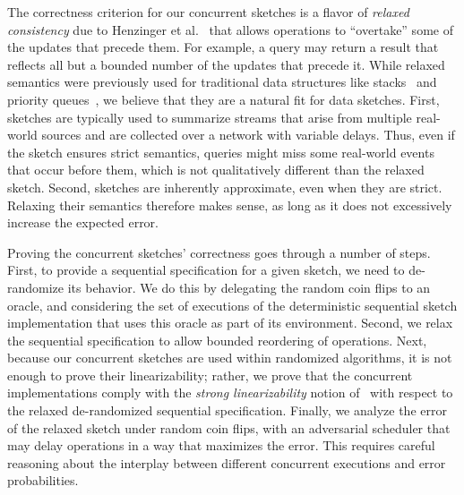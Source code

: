  The correctness criterion for our concurrent sketches is a flavor of 
 \emph{relaxed consistency} due to Henzinger et al.~\cite{Henzinger}    
 that allows operations to ``overtake'' some of the updates that precede them.  
 For example, a query may return a result that reflects all but a bounded number of the updates
 that precede it. 
 While relaxed semantics were previously used for traditional data structures like stacks~\cite{Henzinger} and priority queues~\cite{alistarh}, we believe that they are a natural fit for data sketches. 
First, sketches are typically used to summarize streams that  arise from multiple real-world sources  
and are collected over a network with variable delays. Thus, even if the sketch ensures strict semantics, 
queries might miss some real-world events that occur before them, which is not qualitatively different than the  relaxed sketch. Second, sketches are inherently approximate, even when they are strict. 
Relaxing their semantics therefore makes sense, as long as it does not excessively increase the expected error. 

Proving the concurrent sketches' correctness goes through a number of steps. First, to provide a sequential specification for a given sketch, we need to de-randomize its behavior. We do this by delegating the random coin flips to an oracle, and considering the set of executions of the deterministic
sequential sketch implementation that uses this oracle
as part of its environment.
Second, we relax the sequential specification to allow bounded reordering of operations.
Next, because our concurrent sketches are used within randomized algorithms, 
it is not enough to prove their linearizability; rather, 
we prove that the concurrent implementations comply with the \emph{strong linearizability} notion of~\cite{strongLinearizability} with respect to the relaxed de-randomized sequential specification. 
%
Finally, 
we analyze the error of the relaxed sketch under random coin flips, with an adversarial scheduler that may delay operations in a way that maximizes the error. This requires careful reasoning about the interplay between different concurrent executions and error probabilities. 


